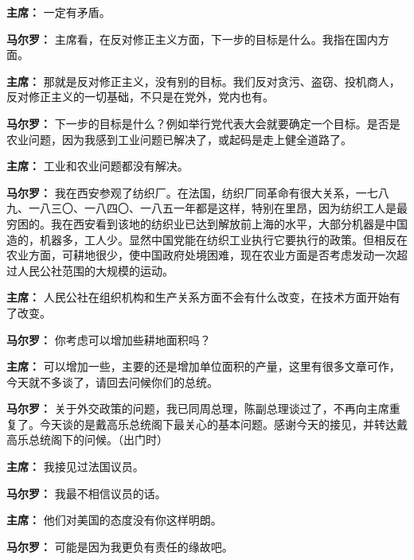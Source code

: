 \begin{list}{}
\item[\textbf{主席：}] 一定有矛盾。

\item[\textbf{马尔罗：}] 主席看，在反对修正主义方面，下一步的目标是什么。我指在国内方面。

\item[\textbf{主席：}] 那就是反对修正主义，没有别的目标。我们反对贪污、盗窃、投机商人，反对修正主义的一切基础，不只是在党外，党内也有。

\item[\textbf{马尔罗：}] 下一步的目标是什么？例如举行党代表大会就要确定一个目标。是否是农业问题，因为我感到工业问题已解决了，或起码是走上健全道路了。

\item[\textbf{主席：}] 工业和农业问题都没有解决。

\item[\textbf{马尔罗：}] 我在西安参观了纺织厂。在法国，纺织厂同革命有很大关系，一七八九、一八三〇、一八四〇、一八五一年都是这样，特别在里昂，因为纺织工人是最穷困的。我在西安看到该地的纺织业已达到解放前上海的水平，大部分机器是中国造的，机器多，工人少。显然中国党能在纺织工业执行它要执行的政策。但相反在农业方面，可耕地很少，使中国政府处境困难，现在农业方面是否考虑发动一次超过人民公社范围的大规模的运动。

\item[\textbf{主席：}] 人民公社在组织机构和生产关系方面不会有什么改变，在技术方面开始有了改变。

\item[\textbf{马尔罗：}] 你考虑可以增加些耕地面积吗？

\item[\textbf{主席：}] 可以增加一些，主要的还是增加单位面积的产量，这里有很多文章可作，今天就不多谈了，请回去问候你们的总统。

\item[\textbf{马尔罗：}] 关于外交政策的问题，我已同周总理，陈副总理谈过了，不再向主席重复了。今天谈的是戴高乐总统阁下最关心的基本问题。感谢今天的接见，并转达戴高乐总统阁下的问候。（出门时）

\item[\textbf{主席：}] 我接见过法国议员。

\item[\textbf{马尔罗：}] 我最不相信议员的话。

\item[\textbf{主席：}] 他们对美国的态度没有你这样明朗。

\item[\textbf{马尔罗：}] 可能是因为我更负有责任的缘故吧。
\end{list}
